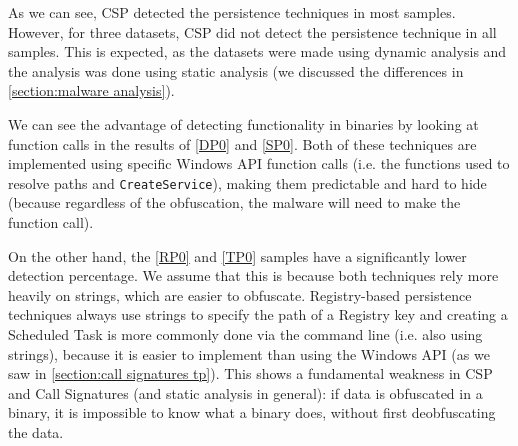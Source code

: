 As we can see, CSP detected the persistence techniques in most samples. However, for three datasets, CSP did not detect the persistence technique in all samples. This is expected, as the datasets were made using dynamic analysis and the analysis was done using static analysis (we discussed the differences in \autoref{section:malware analysis}).

We can see the advantage of detecting functionality in binaries by looking at function calls in the results of \autoref{DP0} and \autoref{SP0}. Both of these techniques are implemented using specific Windows API function calls (i.e. the functions used to resolve paths and \texttt{CreateService}), making them predictable and hard to hide (because regardless of the obfuscation, the malware will need to make the function call).

On the other hand, the \autoref{RP0} and \autoref{TP0} samples have a significantly lower detection percentage. We assume that this is because both techniques rely more heavily on strings, which are easier to obfuscate. Registry-based persistence techniques always use strings to specify the path of a Registry key and creating a Scheduled Task is more commonly done via the command line (i.e. also using strings), because it is easier to implement than using the Windows API (as we saw in \autoref{section:call signatures tp}). This shows a fundamental weakness in CSP and Call Signatures (and static analysis in general): if data is obfuscated in a binary, it is impossible to know what a binary does, without first deobfuscating the data.

\medskip

